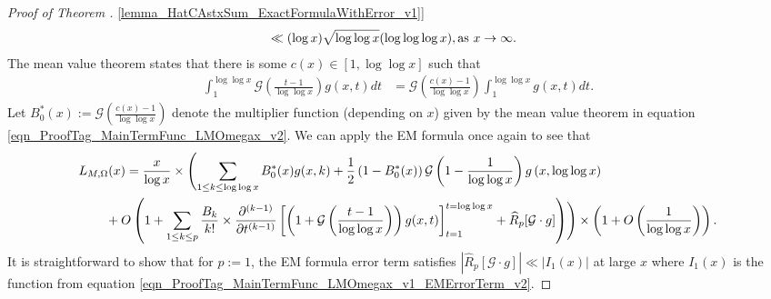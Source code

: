 \documentclass[11pt,reqno,a4letter]{article}
\newcommand{\hlocalref}[1]{\hyperref[#1]{\ref{#1}}}
\numberwithin{equation}{section}
\numberwithin{figure}{section}
\numberwithin{table}{section}
\theoremstyle{plain}
\numberwithin{theorem}{section}
\theoremstyle{definition}
\theoremstyle{remark}
\newcommand{\mathtext}[1]{\text{\rm #1}}
\begin{document}
\begin{proof}[Proof of Theorem \hlocalref{lemma_HatCAstxSum_ExactFormulaWithError_v1}]
\begin{align}
\label{eqn_ProofTag_MainTermFunc_LMOmegax_v1_EMErrorTerm_v2}
     & \ll (\log x) \sqrt{\log\log x} (\log\log\log x), 
     \mathtext{ as } x \rightarrow \infty. 
\end{align}
The mean value theorem states that there is some 
$c(x) \in \left[1, \log\log x\right]$ such that 
\begin{align}
\label{eqn_ProofTag_MainTermFunc_LMOmegax_v2} 
\int_1^{\log\log x} 
	\mathcal{G}\left(\frac{t-1}{\log\log x}\right) g(x, t) dt & = 
	\mathcal{G}\left(\frac{c(x)-1}{\log\log x}\right) 
	\int_1^{\log\log x} g(x, t) dt. 
\end{align}
Let $B_0^{\ast}(x) := \mathcal{G}\left(\frac{c(x)-1}{\log\log x}\right)$ 
denote the multiplier function (depending on $x$) 
given by the mean value theorem 
in equation \eqref{eqn_ProofTag_MainTermFunc_LMOmegax_v2}. 
We can apply the EM formula once again to see that 
\begin{align}
\label{eqn_ProofTag_MainTermFunc_LMOmegax_v3} 
 & L_{M,\Omega}(x) = \frac{x}{\log x} \times \Biggl(
        \sum_{1 \leq k \leq \log\log x} B_0^{\ast}(x) g(x, k) + 
	\frac{1}{2}\left(1 - B_0^{\ast}(x)\right) 
        \mathcal{G}\left(1-\frac{1}{\log\log x}\right) 
	g\left(x, \log\log x\right) \\ 
\notag
	& \phantom{=\quad\ } + 
	O\left(1 + \sum_{1 \leq k \leq p} \frac{B_{k}}{k!} \times \frac{\partial^{(k-1)}}{\partial t^{(k-1)}} 
	\left[\left(1 + \mathcal{G}\left(\frac{t-1}{\log\log x}\right)\right) g(x, t) 
     \right]_{t=1}^{t=\log\log x} + \widehat{R}_p[\mathcal{G} \cdot g]\right) 
	\Biggr) \times \left(1 + O\left(\frac{1}{\log\log x}\right)\right). 
\end{align}
It is straightforward to show that for $p := 1$, the EM formula error term 
satisfies $\left\lvert \widehat{R}_p[\mathcal{G} \cdot g] \right\rvert \ll \left\lvert I_1(x) \right\rvert$ 
at large $x$ where $I_1(x)$ is the function from 
equation \eqref{eqn_ProofTag_MainTermFunc_LMOmegax_v1_EMErrorTerm_v2}. 


\end{proof}
\end{document}

